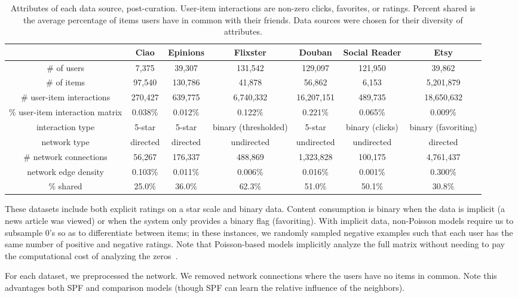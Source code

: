 \documentclass{sig-alternate-2013}
\begin{document}
\begin{table}[thb]
\centering
\begin{tabular}{c c c c c c c}
& \textbf{Ciao} & \textbf{Epinions} & \textbf{Flixster} & \textbf{Douban} & \textbf{Social Reader} & \textbf{Etsy} \\
\hline
\# of users & 7,375 & 39,307 & 131,542 & 129,097 & 121,950 & 39,862 \\
\# of items & 97,540 & 130,786 & 41,878 & 56,862 & 6,153 & 5,201,879 \\
\# user-item interactions & 270,427 & 639,775 & 6,740,332 & 16,207,151 & 489,735 & 18,650,632 \\
\% user-item interaction matrix & 0.038\% & 0.012\% & 0.122\% & 0.221\% & 0.065\% & 0.009\% \\
interaction type & 5-star & 5-star & binary (thresholded) & 5-star & binary (clicks) & binary (favoriting)\\
network type & directed & directed & undirected & undirected & undirected & directed \\
\# network connections & 56,267 & 176,337 & 488,869 & 1,323,828 & 100,175 & 4,761,437 \\
network edge density & 0.103\% & 0.011\% & 0.006\% & 0.016\% & 0.001\% & 0.300\% \\
\% shared & 25.0\% & 36.0\% & 62.3\% & 51.0\% & 50.1\% & 30.8\% \\
\end{tabular}
\caption{Attributes of each data source, post-curation.  User-item interactions are non-zero clicks, favorites, or ratings.  Percent
  shared is the average percentage of items users have in common with
  their friends.  Data sources were chosen for their diversity of attributes.}\label{table:stats}
\end{table}
These datasets include both explicit ratings on a star scale and
binary data.  Content consumption is binary when the data is implicit
(a news article was viewed) or when the system only provides a binary
flag (favoriting).  With implicit data, non-Poisson models require us
to subsample 0's so as to differentiate between items; in these
instances, we randomly sampled negative examples such that each user
has the same number of positive and negative ratings.  Note that
Poisson-based models implicitly analyze the full matrix without
needing to pay the computational cost of analyzing the
zeros~\cite{poisMF}.

For each dataset, we preprocessed the network.  We removed network
connections where the users have no items in common.  Note this
advantages both SPF and comparison models (though SPF can learn the
relative influence of the neighbors).
\end{document}
